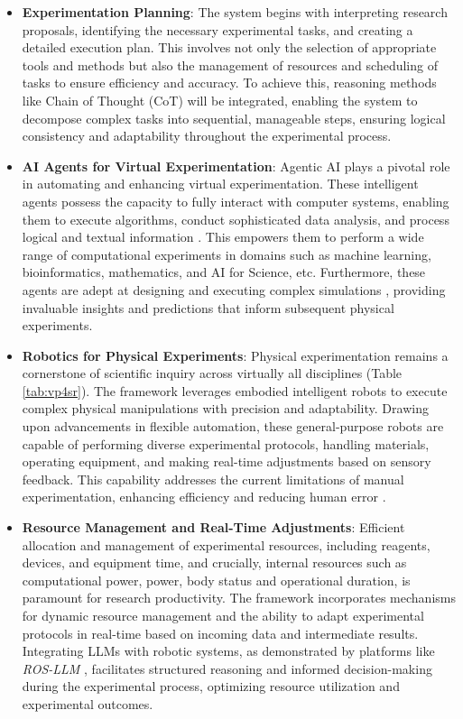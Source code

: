 \begin{itemize}
    \item \textbf{Experimentation Planning}: The system begins with interpreting research proposals, identifying the necessary experimental tasks, and creating a detailed execution plan. This involves not only the selection of appropriate tools and methods but also the management of resources and scheduling of tasks to ensure efficiency and accuracy. To achieve this,  reasoning methods like Chain of Thought (CoT)\cite{wei2022chain} will be integrated, enabling the system to decompose complex tasks into sequential, manageable steps, ensuring logical consistency and adaptability throughout the experimental process.

    \item \textbf{AI Agents for Virtual Experimentation}: Agentic AI plays a pivotal role in automating and enhancing virtual experimentation. These intelligent agents possess the capacity to fully interact with computer systems, enabling them to execute algorithms, conduct sophisticated data analysis, and process logical and textual information \cite{lu2024ai}. This empowers them to perform a wide range of computational experiments in domains such as machine learning, bioinformatics, mathematics, and AI for Science, etc. Furthermore, these agents are adept at designing and executing complex simulations \cite{jablonka202314}, providing invaluable insights and predictions that inform subsequent physical experiments.
    
    \item \textbf{Robotics for Physical Experiments}: Physical experimentation remains a cornerstone of scientific inquiry across virtually all disciplines (Table \ref{tab:vp4sr}). The framework leverages embodied intelligent robots to execute complex physical manipulations with precision and adaptability. Drawing upon advancements in flexible automation, these general-purpose robots are capable of performing diverse experimental protocols, handling materials, operating equipment, and making real-time adjustments based on sensory feedback. This capability addresses the current limitations of manual experimentation, enhancing efficiency and reducing human error \cite{darvish2024organa}.

    
    \item \textbf{Resource Management and Real-Time Adjustments}: Efficient allocation and management of experimental resources, including reagents, devices, and equipment time, and crucially, internal resources such as computational power, power, body status and operational duration, is paramount for research productivity. The framework incorporates mechanisms for dynamic resource management and the ability to adapt experimental protocols in real-time based on incoming data and intermediate results. Integrating LLMs with robotic systems, as demonstrated by platforms like \textit{ROS-LLM} \cite{mower2024ros}, facilitates structured reasoning and informed decision-making during the experimental process, optimizing resource utilization and experimental outcomes.
    

\end{itemize}
